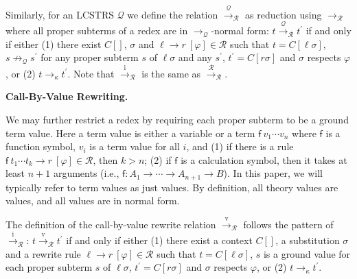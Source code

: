  
 
Similarly, for an LCSTRS $\mathcal{Q}$ we define the relation $\xrightarrow{\scriptscriptstyle\mathcal{Q}}_{\mathcal{R}}$ as reduction using $\rightarrow_{\mathcal{R}}$ where all proper subterms of a redex are in $\rightarrow_{\mathcal{Q}}$-normal form: $t\xrightarrow{\scriptscriptstyle\mathcal{Q}}_{\mathcal{R}}t^{\prime}$ if and only if either (1) there exist ${C}[]$, $\sigma$ and ${\ell}\rightarrow{r}\ [\varphi]\in\mathcal{R}$ such that $t={C}[\ell\sigma]$, $s\not\rightarrow_{\mathcal{Q}}s^{\prime}$ for any proper subterm $s$ of $\ell\sigma$ and any $s^{\prime}$, $t^{\prime}={C}[r\sigma]$ and $\sigma$ respects $\varphi$, or (2) $t\rightarrow_{\kappa}t^{\prime}$. Note that $\xrightarrow{\scriptscriptstyle\mathrm{i}}_{\mathcal{R}}$ is the same as $\xrightarrow{\scriptscriptstyle\mathcal{R}}_{\mathcal{R}}$.\par
 
 
 
 
\par\medskip\noindent\textbf{Call-By-Value Rewriting.}\par
 
 
We may further restrict a redex by requiring each proper subterm to be a ground term value. Here a term value is either a variable or a term ${\mathsf{f}}\ {{v}_{1}\cdots{v}_{n}}$ where $\mathsf{f}$ is a function symbol, $v_{i}$ is a term value for all $i$, and (1) if there is a rule ${{\mathsf{f}}\ {{t}_{1}\cdots{t}_{k}}}\rightarrow{r}\ [\varphi]\in\mathcal{R}$, then $k>n$; (2) if $\mathsf{f}$ is a calculation symbol, then it takes at least $n+1$ arguments (i.e., $\mathsf{f}:{A}_{1}\rightarrow\cdots\rightarrow{A}_{n+1}\rightarrow B$). In this paper, we will typically refer to term values as just values. By definition, all theory values are values, and all values are in normal form.\par
 
 
 
The definition of the call-by-value rewrite relation $\xrightarrow{\scriptscriptstyle\mathrm{v}}_{\mathcal{R}}$ follows the pattern of $\xrightarrow{\scriptscriptstyle\mathrm{i}}_{\mathcal{R}}$: $t\xrightarrow{\scriptscriptstyle\mathrm{v}}_{\mathcal{R}}t^{\prime}$ if and only if either (1) there exist a context ${C}[]$, a substitution $\sigma$ and a rewrite rule ${\ell}\rightarrow{r}\ [\varphi]\in\mathcal{R}$ such that $t={C}[\ell\sigma]$, $s$ is a ground value for each proper subterm $s$ of $\ell\sigma$, $t^{\prime}={C}[r\sigma]$ and $\sigma$ respects $\varphi$, or (2) $t\rightarrow_{\kappa}t^{\prime}$.\par
 
